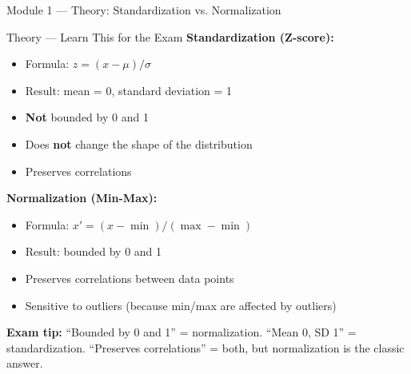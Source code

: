 \documentclass[aspectratio=169,10pt]{beamer}
\newcommand{\theory}[1]{%
	\begin{block}{Theory --- Learn This for the Exam}
		\small #1
	\end{block}
}
\begin{document}
	\begin{frame}{Module 1 --- Theory: Standardization vs. Normalization}
		\theory{
			\textbf{Standardization (Z-score):}
			\begin{itemize}
				\item Formula: $z = (x - \mu) / \sigma$
				\item Result: mean = 0, standard deviation = 1
				\item \textbf{Not} bounded by 0 and 1
				\item Does \textbf{not} change the shape of the distribution
				\item Preserves correlations
			\end{itemize}
			\textbf{Normalization (Min-Max):}
			\begin{itemize}
				\item Formula: $x' = (x - \min) / (\max - \min)$
				\item Result: bounded by 0 and 1
				\item Preserves correlations between data points
				\item Sensitive to outliers (because min/max are affected by outliers)
			\end{itemize}
			\textbf{Exam tip:} ``Bounded by 0 and 1'' = normalization. ``Mean 0, SD 1'' = standardization. ``Preserves correlations'' = both, but normalization is the classic answer.
		}
	\end{frame}
	
\end{document}
